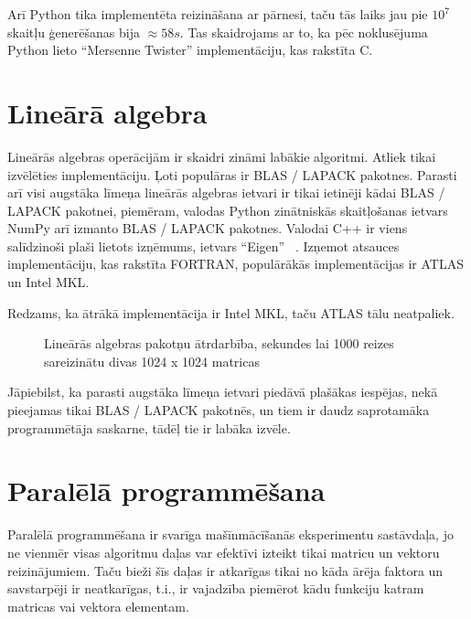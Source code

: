 \documentclass{ludis}
\begin{document}
Arī Python tika implementēta reizināšana ar pārnesi, taču tās laiks jau pie $10^7$ skaitļu ģenerēšanas bija $\approx 58 s$. Tas skaidrojams ar to, ka pēc noklusējuma Python lieto ``Mersenne Twister'' implementāciju, kas rakstīta C.

\section{Lineārā algebra}
Lineārās algebras operācijām ir skaidri zināmi labākie algoritmi. Atliek tikai izvēlēties implementāciju. Ļoti populāras ir BLAS / LAPACK pakotnes. Parasti arī visi augstāka līmeņa lineārās algebras ietvari ir tikai ietinēji kādai BLAS / LAPACK pakotnei, piemēram, valodas Python zinātniskās skaitļošanas ietvars NumPy arī izmanto BLAS / LAPACK pakotnes. Valodai C++ ir viens salīdzinoši plaši lietots izņēmums, ietvars ``Eigen'' ~\cite{eigen_org}.  Izņemot atsauces implementāciju, kas rakstīta FORTRAN, populārākās implementācijas ir ATLAS un Intel MKL.

Redzams, ka ātrākā implementācija ir Intel MKL, taču ATLAS tālu neatpaliek.
\begin{figure}[!hta]
  \centering
  \caption[Lineārās algebras pakotņu ātrdarbība]{Lineārās algebras pakotņu ātrdarbība, sekundes lai 1000 reizes sareizinātu divas 1024 x 1024 matricas}
  \label{fig:blas_performance}
\end{figure}

Jāpiebilst, ka parasti augstāka līmeņa ietvari piedāvā plašākas iespējas, nekā pieejamas tikai BLAS / LAPACK pakotnēs, un tiem ir daudz saprotamāka programmētāja saskarne, tādēļ tie ir labāka izvēle.

\section{Paralēlā programmēšana}
Paralēlā programmēšana ir svarīga mašīnmācīšanās eksperimentu sastāvdaļa, jo ne vienmēr visas algoritmu daļas var efektīvi izteikt tikai matricu un vektoru reizinājumiem. Taču bieži šīs daļas ir atkarīgas tikai no kāda ārēja faktora un savstarpēji ir neatkarīgas, t.i., ir vajadzība piemērot kādu funkciju katram matricas vai vektora elementam.
\end{document}
